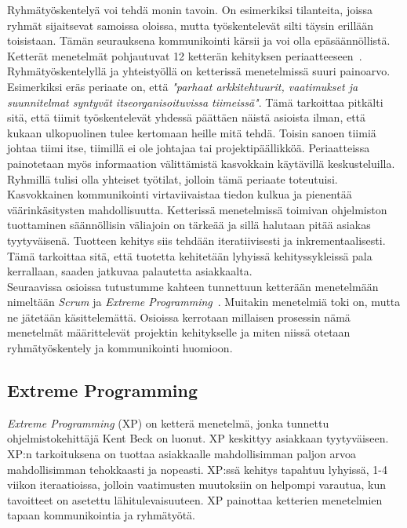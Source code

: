 \documentclass[finnish]{../tktltiki2}
\theoremstyle{definition}
\theoremstyle{remark}
\begin{document}
Ryhmätyöskentelyä voi tehdä monin tavoin. On esimerkiksi tilanteita, 
joissa ryhmät sijaitsevat samoissa oloissa, mutta työskentelevät silti 
täysin erillään toisistaan. Tämän seurauksena kommunikointi kärsii ja 
voi olla epäsäännöllistä. Ketterät menetelmät pohjautuvat 12 ketterän 
kehityksen periaatteeseen~\cite{AgileManifesto}. Ryhmätyöskentelyllä 
ja yhteistyöllä on ketterissä
menetelmissä suuri painoarvo. Esimerkiksi eräs periaate on, että 
\emph{"parhaat arkkitehtuurit, vaatimukset ja suunnitelmat syntyvät 
itseorganisoituvissa
tiimeissä"}. Tämä tarkoittaa pitkälti sitä, että tiimit työskentelevät 
yhdessä päättäen näistä asioista ilman, että kukaan ulkopuolinen tulee
kertomaan heille mitä tehdä. Toisin sanoen tiimiä johtaa tiimi itse, 
tiimillä ei ole johtajaa tai projektipäällikköä. Periaatteissa 
painotetaan
myös informaation välittämistä kasvokkain käytävillä keskusteluilla. 
Ryhmillä tulisi olla yhteiset työtilat, jolloin tämä periaate 
toteutuisi.
Kasvokkainen kommunikointi virtaviivaistaa tiedon kulkua ja pienentää 
väärinkäsitysten mahdollisuutta.
Ketterissä menetelmissä toimivan ohjelmiston tuottaminen säännöllisin 
väliajoin on tärkeää ja sillä halutaan pitää asiakas tyytyväisenä.
Tuotteen kehitys siis tehdään iteratiivisesti ja inkrementaalisesti. 
Tämä tarkoittaa sitä, että tuotetta kehitetään lyhyissä 
kehityssykleissä pala kerrallaan, saaden jatkuvaa palautetta 
asiakkaalta.\\

Seuraavissa osioissa tutustumme kahteen tunnettuun
ketterään menetelmään nimeltään \emph{Scrum} ja \emph{Extreme Programming}~\cite{ScrumFinnishGuide,Scrumprimer,ScrumHandBook,Beck:2004:EPE:1076267}. Muitakin menetelmiä toki on, mutta ne jätetään käsittelemättä. Osioissa kerrotaan millaisen prosessin nämä menetelmät
määrittelevät projektin kehitykselle ja miten niissä otetaan ryhmätyöskentely ja kommunikointi huomioon.

\subsection{Extreme Programming}

\emph{Extreme Programming} (XP) on ketterä menetelmä, jonka tunnettu 
ohjelmistokehittäjä Kent Beck on luonut. XP keskittyy asiakkaan tyytyväiseen. XP:n tarkoituksena on tuottaa 
asiakkaalle mahdollisimman paljon arvoa mahdollisimman tehokkaasti ja nopeasti.
XP:ssä kehitys tapahtuu lyhyissä, 1-4 viikon iteraatioissa, jolloin vaatimusten 
muutoksiin on helpompi varautua, kun tavoitteet on asetettu 
lähitulevaisuuteen. XP painottaa ketterien menetelmien tapaan kommunikointia ja ryhmätyötä.
\end{document}
